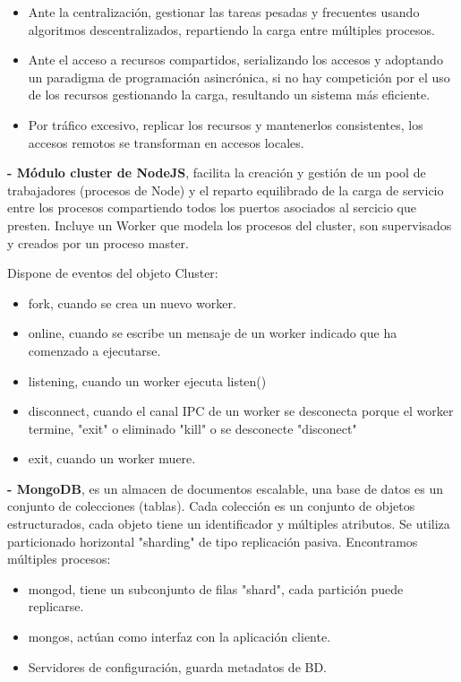 \documentclass[12pt]{amsart}
\begin{document}
    \begin{itemize}
        \item Ante la centralización, gestionar las tareas pesadas y frecuentes usando algoritmos descentralizados, repartiendo la carga entre múltiples procesos.
        
        \item Ante el acceso a recursos compartidos, serializando los accesos y adoptando un paradigma de programación asincrónica, si no hay competición por el uso de los recursos gestionando la carga, resultando un sistema más eficiente.
        
        \item Por tráfico excesivo, replicar los recursos y mantenerlos consistentes, los accesos remotos se transforman en accesos locales.
    \end{itemize}
    
    \textbf{- Módulo cluster de NodeJS}, facilita la creación y gestión de un pool de trabajadores (procesos de Node) y el reparto equilibrado de la carga de servicio entre los procesos compartiendo todos los puertos asociados al sercicio que presten. Incluye un Worker que modela los procesos del cluster, son supervisados y creados por un proceso master.
    
    Dispone de eventos del objeto Cluster:
    \begin{itemize}
        \item fork, cuando se crea un nuevo worker.
        \item online, cuando se escribe un mensaje de un worker indicado que ha comenzado a ejecutarse.
        \item listening, cuando un worker ejecuta listen()
        \item disconnect, cuando el canal IPC de un worker se desconecta porque el worker termine, "exit" o eliminado "kill" o se desconecte "disconect"
        \item exit, cuando un worker muere.
    \end{itemize}
    \textbf{- MongoDB}, es un almacen de documentos escalable, una base de datos es un conjunto de colecciones (tablas). Cada colección es un conjunto de objetos estructurados, cada objeto tiene un identificador y múltiples atributos. Se utiliza particionado horizontal "sharding" de tipo replicación pasiva.
    Encontramos múltiples procesos:
    
    \begin{itemize}
        \item mongod, tiene un subconjunto de filas "shard", cada partición puede replicarse.
        \item mongos, actúan como interfaz con la aplicación cliente.
        \item Servidores de configuración, guarda metadatos de BD.
    \end{itemize}
    
    
\end{document}
